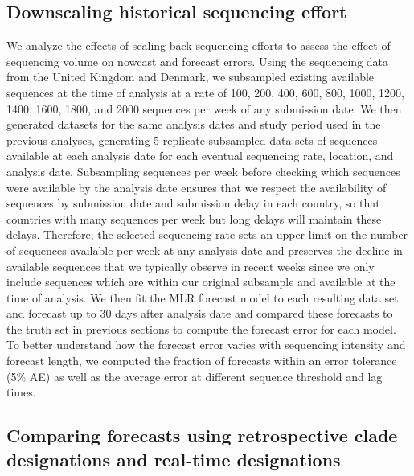 \documentclass[10pt,letterpaper]{article}
\begin{document}
\subsection*{Downscaling historical sequencing effort}

We analyze the effects of scaling back sequencing efforts to assess the effect of sequencing volume on nowcast and forecast errors.
Using the sequencing data from the United Kingdom and Denmark, we subsampled existing available sequences at the time of analysis at a rate of 100, 200, 400, 600, 800, 1000, 1200, 1400, 1600, 1800, and 2000 sequences per week of any submission date.
We then generated datasets for the same analysis dates and study period used in the previous analyses, generating 5 replicate subsampled data sets of sequences available at each analysis date for each eventual sequencing rate, location, and analysis date.
Subsampling sequences per week before checking which sequences were available by the analysis date ensures that we respect the availability of sequences by submission date and submission delay in each country, so that countries with many sequences per week but long delays will maintain these delays.
Therefore, the selected sequencing rate sets an upper limit on the number of sequences available per week at any analysis date and preserves the decline in available sequences that we typically observe in recent weeks since we only include sequences which are within our original subsample and available at the time of analysis.
We then fit the MLR forecast model to each resulting data set and forecast up to 30 days after analysis date and compared these forecasts to the truth set in previous sections to compute the forecast error for each model.
To better understand how the forecast error varies with sequencing intensity and forecast length, we computed the fraction of forecasts within an error tolerance (5\% AE) as well as the average error at different sequence threshold and lag times.

\subsection*{Comparing forecasts using retrospective clade designations and real-time designations}
\end{document}
